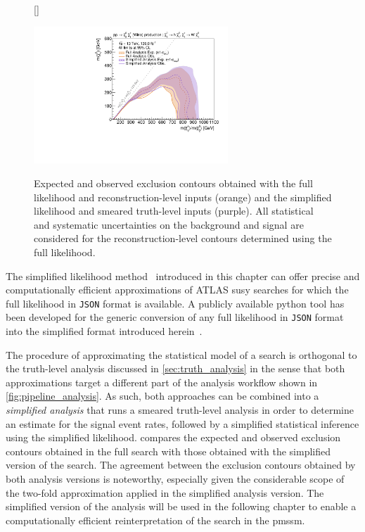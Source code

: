 \begin{figure}
[\FBwidth]
{\caption{Expected and observed exclusion contours obtained with the full likelihood and reconstruction-level inputs (orange) and the simplified likelihood and smeared truth-level inputs (purple). All statistical and systematic uncertainties on the background and signal are considered for the reconstruction-level contours determined using the full likelihood.}\label{fig:exclusion_1Lbb_truthInput_BkgSignal_700_200_noLabel}}
{\includegraphics[width=0.65\textwidth]{exclusion_1Lbb_truthInput_BkgSignal_700_200_noLabel_v2}}
\end{figure}

The simplified likelihood method~\cite{Schanet:2758958} introduced in this chapter can offer precise and computationally efficient approximations of ATLAS \gls{susy} searches for which the full likelihood in \texttt{JSON} format is available. A publicly available python tool has been developed for the generic conversion of any full likelihood in \texttt{JSON} format into the simplified format introduced herein~\cite{simplify}.

The procedure of approximating the statistical model of a search is orthogonal to the truth-level analysis discussed in \cref{sec:truth_analysis} in the sense that both approximations target a different part of the analysis workflow shown in \cref{fig:pipeline_analysis}.
As such, both approaches can be combined into a \textit{simplified analysis} that runs a smeared truth-level analysis in order to determine an estimate for the signal event rates, followed by a simplified statistical inference using the simplified likelihood.
 compares the expected and observed exclusion contours obtained in the full \onelepton search with those obtained with the simplified version of the search.
The agreement between the exclusion contours obtained by both analysis versions is noteworthy, especially given the considerable scope of the two-fold approximation applied in the simplified analysis version.
The simplified version of the \onelepton analysis will be used in the following chapter to enable a computationally efficient reinterpretation of the \onelepton search in the \gls{pmssm}.



